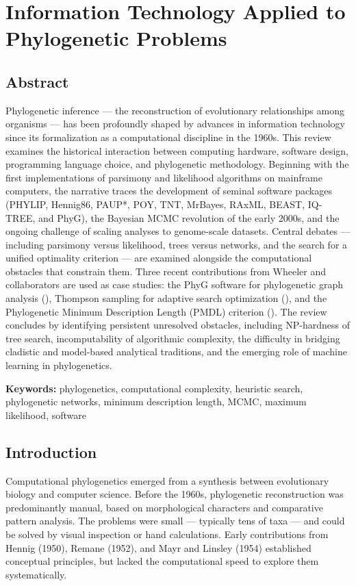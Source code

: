 \chapter{Information Technology Applied to Phylogenetic Problems}

\section*{Abstract}

Phylogenetic inference --- the reconstruction of evolutionary relationships among organisms --- has been profoundly shaped by advances in information technology since its formalization as a computational discipline in the 1960s. This review examines the historical interaction between computing hardware, software design, programming language choice, and phylogenetic methodology. Beginning with the first implementations of parsimony and likelihood algorithms on mainframe computers, the narrative traces the development of seminal software packages (PHYLIP, Hennig86, PAUP*, POY, TNT, MrBayes, RAxML, BEAST, IQ-TREE, and PhyG), the Bayesian MCMC revolution of the early 2000s, and the ongoing challenge of scaling analyses to genome-scale datasets. Central debates --- including parsimony versus likelihood, trees versus networks, and the search for a unified optimality criterion --- are examined alongside the computational obstacles that constrain them. Three recent contributions from Wheeler and collaborators are used as case studies: the PhyG software for phylogenetic graph analysis (\textcite{wheeler2024a}), Thompson sampling for adaptive search optimization (\textcite{wheeler2024}), and the Phylogenetic Minimum Description Length (PMDL) criterion (\textcite{wheeler2025}). The review concludes by identifying persistent unresolved obstacles, including NP-hardness of tree search, incomputability of algorithmic complexity, the difficulty in bridging cladistic and model-based analytical traditions, and the emerging role of machine learning in phylogenetics.

\textbf{Keywords:} phylogenetics, computational complexity, heuristic search, phylogenetic networks, minimum description length, MCMC, maximum likelihood, software

\section{Introduction}

Computational phylogenetics emerged from a synthesis between evolutionary biology and computer science. Before the 1960s, phylogenetic reconstruction was predominantly manual, based on morphological characters and comparative pattern analysis. The problems were small --- typically tens of taxa --- and could be solved by visual inspection or hand calculations. Early contributions from Hennig (1950), Remane (1952), and Mayr and Linsley (1954) established conceptual principles, but lacked the computational speed to explore them systematically.

